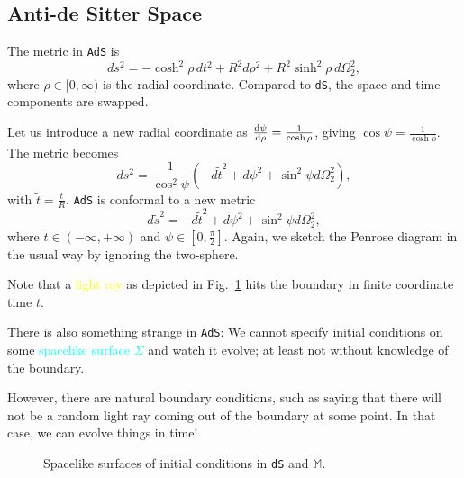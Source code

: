 
\subsection{Anti-de Sitter Space}%
\label{sub:anti_de_sitter_space_penrose}

The metric in \texttt{AdS} is
\begin{equation}
  ds^2 = -\cosh^2\rho \, dt^2 + R^2 d\rho^2 + R^2 \sinh^2 \rho \, d\Omega^2_2,
\end{equation}
where $\rho \in [0, \infty)$ is the radial coordinate.
Compared to \texttt{dS}, the space and time components are swapped.

Let us introduce a new radial coordinate as $\dv{\psi}{\rho}= \frac{1}{\cosh \rho}$, giving $\cos \psi = \frac{1}{\cosh \rho}$. The metric becomes
\begin{equation}
  ds^2 = \frac{1}{\cos^2\psi} \left( -d \tilde{t}^2 + d\psi^2 + \sin^2 \psi d\Omega^2_2 \right),
\end{equation}
with $\widetilde{t} = \frac{t}{R}$. \texttt{AdS} is conformal to a new metric
\begin{equation}
  d\tilde{s}^2 = -d\tilde{t}^2 + d\psi^2 + \sin^2\psi d\Omega^2_2,
\end{equation}
where $\tilde{t} \in (-\infty, + \infty)$ and $\psi \in [0, \frac{\pi}{2}]$.
Again, we sketch the Penrose diagram in the usual way by ignoring the two-sphere.

\begin{figure}[tbhp]
  \centering
  \def\svgwidth{0.5\columnwidth}
  
  \caption{}
  \label{fig:l18f1}
\end{figure}

Note that a \textcolor{yellow}{light ray} as depicted in Fig.~\ref{fig:l18f1} hits the boundary in finite coordinate time $t$.
\begin{remark}
  There is also something strange in \texttt{AdS}: We cannot specify initial conditions on some  \textcolor{Aqua}{spacelike surface $\Sigma$} and watch it evolve; at least not without knowledge of the boundary.
\end{remark}
However, there are natural boundary conditions, such as saying that there will not be a random light ray coming out of the boundary at some point.
In that case, we can evolve things in time!

\begin{figure}[tbhp]
  \centering
  \def\svgwidth{0.5\columnwidth}
  
  \caption{Spacelike surfaces of initial conditions in \texttt{dS} and $\mathbb{M}$.}
  \label{fig:l18f2}
\end{figure}

